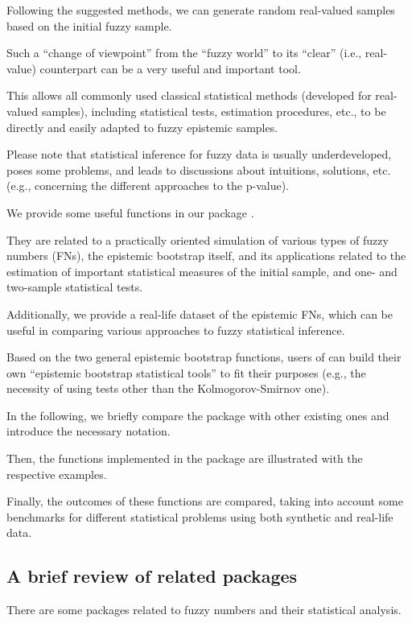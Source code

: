 Following the suggested methods, we can generate random real-valued samples based on the initial fuzzy sample.

Such a ``change of viewpoint'' from the ``fuzzy world'' to its ``clear'' (i.e., real-value) counterpart can be a very useful and important tool.

This allows all commonly used classical statistical methods (developed for real-valued samples), including statistical tests, estimation procedures, etc., to be directly and easily adapted to fuzzy epistemic samples.

Please note that statistical inference for fuzzy data is usually underdeveloped, poses some problems, and leads to discussions about intuitions, solutions, etc. (e.g., concerning the different approaches to the p-value).

We provide some useful functions in our package .

They are related to a practically oriented simulation of various types of fuzzy numbers (FNs), the epistemic bootstrap itself, and its applications related to the estimation of important statistical measures of the initial sample, and one- and two-sample statistical tests.

Additionally, we provide a real-life dataset of the epistemic FNs, which can be useful in comparing various approaches to fuzzy statistical inference.

Based on the two general epistemic bootstrap functions, users of  can build their own ``epistemic bootstrap statistical tools'' to fit their purposes (e.g., the necessity of using tests other than the Kolmogorov-Smirnov one).

In the following, we briefly compare the  package with other existing ones and introduce the necessary notation.

Then, the functions implemented in the package are illustrated with the respective examples.

Finally, the outcomes of these functions are compared, taking into account some benchmarks for different statistical problems using both synthetic and real-life data. 


\subsection{A brief review of related packages}

There are some packages related to fuzzy numbers and their statistical analysis.

